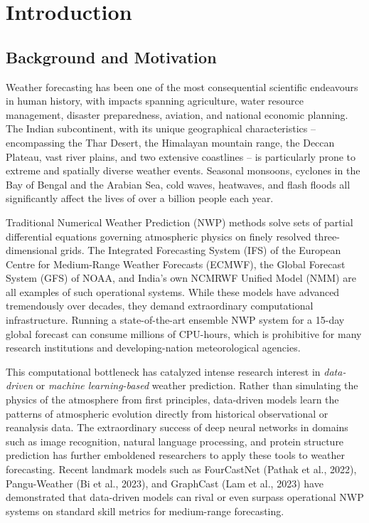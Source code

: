 \documentclass[12pt,a4paper,oneside]{report}
\begin{document}
\newpage

\setcounter{page}{1}
\pagestyle{fancy}

\chapter{Introduction}

\section{Background and Motivation}

Weather forecasting has been one of the most consequential scientific endeavours in human history, with impacts spanning agriculture, water resource management, disaster preparedness, aviation, and national economic planning. The Indian subcontinent, with its unique geographical characteristics -- encompassing the Thar Desert, the Himalayan mountain range, the Deccan Plateau, vast river plains, and two extensive coastlines -- is particularly prone to extreme and spatially diverse weather events. Seasonal monsoons, cyclones in the Bay of Bengal and the Arabian Sea, cold waves, heatwaves, and flash floods all significantly affect the lives of over a billion people each year.

Traditional Numerical Weather Prediction (NWP) methods solve sets of partial differential equations governing atmospheric physics on finely resolved three-dimensional grids. The Integrated Forecasting System (IFS) of the European Centre for Medium-Range Weather Forecasts (ECMWF), the Global Forecast System (GFS) of NOAA, and India's own NCMRWF Unified Model (NMM) are all examples of such operational systems. While these models have advanced tremendously over decades, they demand extraordinary computational infrastructure. Running a state-of-the-art ensemble NWP system for a 15-day global forecast can consume millions of CPU-hours, which is prohibitive for many research institutions and developing-nation meteorological agencies.

This computational bottleneck has catalyzed intense research interest in \textit{data-driven} or \textit{machine learning-based} weather prediction. Rather than simulating the physics of the atmosphere from first principles, data-driven models learn the patterns of atmospheric evolution directly from historical observational or reanalysis data. The extraordinary success of deep neural networks in domains such as image recognition, natural language processing, and protein structure prediction has further emboldened researchers to apply these tools to weather forecasting. Recent landmark models such as FourCastNet (Pathak et al., 2022), Pangu-Weather (Bi et al., 2023), and GraphCast (Lam et al., 2023) have demonstrated that data-driven models can rival or even surpass operational NWP systems on standard skill metrics for medium-range forecasting.
\end{document}

